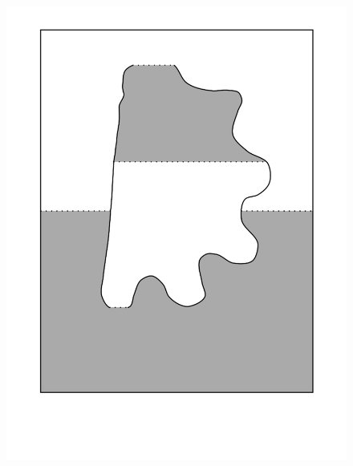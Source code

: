 \begin{figure}[htbp]
\centering
\includegraphics{figures/92_Appendix_Visual_Aids_Materials/shaded_card2.png}
\caption{}
\end{figure}

\clearpage


